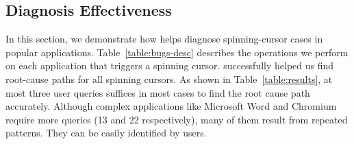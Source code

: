 \subsection{Diagnosis Effectiveness}\label{sec:casestudy}

In this section, we demonstrate how \xxx helps diagnose \nbug
spinning-cursor cases in popular applications. Table~\ref{table:bugs-desc}
describes the operations we perform on each application that triggers a
spinning cursor.  \xxx successfully helped us find root-cause paths for
all spinning cursors.  As shown in Table~\ref{table:results}, at most
three user queries suffices in most cases to find the root cause path
accurately. Although complex applications like Microsoft Word and Chromium
require more queries (13 and 22 respectively), many of them result from
repeated patterns. They can be easily identified by users.









